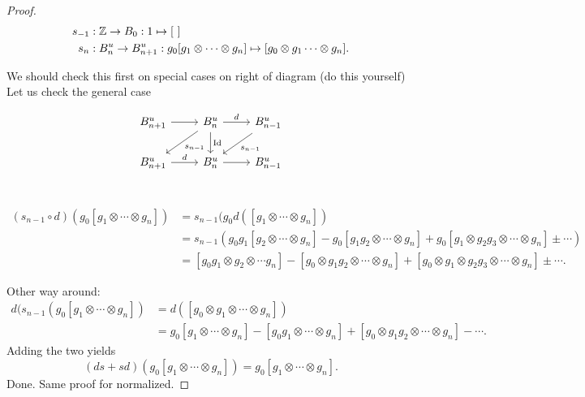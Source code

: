 \begin{proof}
 \begin{align*}
     s_{-1}&: \mathbb{Z} \to  B_0: 1 \mapsto [\ ]\\
    s_{n}&: B^{u}_n \to  B_{n+1}^{u}: g_0[g_1 \otimes \cdots \otimes g_n] \mapsto [g_0 \otimes g_1 \cdots \otimes g_n]
.\end{align*} 

We should check this first on special cases on right of diagram (do this yourself)
Let us check the general case

\[
    \begin{tikzcd}
        B^u_{n+1} \arrow[r, ""]
        & B^u_{n} \arrow[dl, "s_{n-1}"]\arrow[r, "d"] \arrow[d, "\operatorname{Id}"]
        & B^u_{n-1} \arrow[dl, "s_{n-1}"]\\
        B^u_{n+1} \arrow[r, "d"]
        & B^u_{n} \arrow[r, ""]
        & B^u_{n-1}\\
    \end{tikzcd}
\]

\begin{align*}
    (s_{n-1}  \circ  d)(g_0[g_1 \otimes \cdots \otimes g_n]) &= s_{n-1}(g_0 d([g_1 \otimes \cdots \otimes g_n])\\
                                                             &= s_{n-1}(
                                                             g_0 g_1[g_2 \otimes \cdots \otimes g_n]
                                                             - g_0 [g_1 g_2 \otimes \cdots \otimes g_n]
                                                             + g_0[g_1 \otimes g_2 g_3 \otimes \cdots \otimes g_n] \pm \cdots)\\
                                                             &= [g_0 g_1 \otimes g_2 \otimes \cdots g_n] - [g_0 \otimes g_1 g_2 \otimes \cdots \otimes g_n] + [g_0 \otimes g_1 \otimes g_2 g_{3} \otimes \cdots \otimes g_n] \pm \cdots
.\end{align*}       

Other way around:
\begin{align*}
    d(s_{n-1}(g_0 [g_1 \otimes \cdots \otimes g_n]) &= d([g_0 \otimes g_1 \otimes \cdots  \otimes g_n])\\
                                                    &= g_0 [g_1 \otimes \cdots \otimes g_n]
                                                    - [g_0 g_1 \otimes \cdots \otimes g_n]
                                                    + [g_0 \otimes g_1 g_2 \otimes \cdots \otimes g_n]
                                                    - \cdots 
.\end{align*}
Adding the two yields
\[
    (ds + sd)(g_0 [g_1 \otimes \cdots \otimes g_n]) = g_0 [g_1 \otimes \cdots \otimes g_n]
.\] 
Done. 
Same proof for normalized.
\end{proof}


